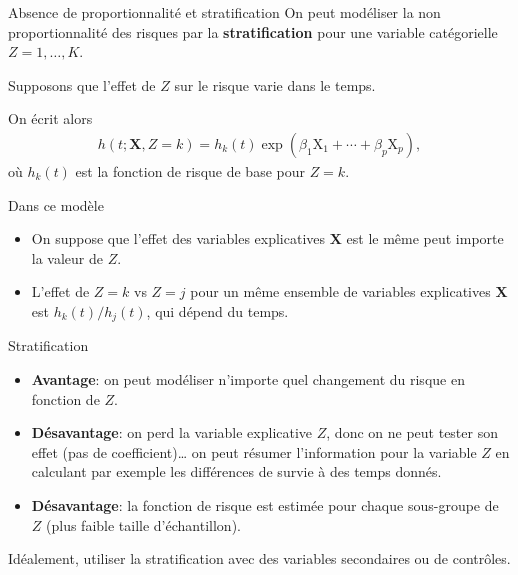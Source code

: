 \documentclass[
  ignorenonframetext,
]{beamer}
\providecommand{\tightlist}{%
  \setlength{\itemsep}{0pt}\setlength{\parskip}{0pt}}\usepackage{longtable,booktabs,array}
\begin{document}
\begin{frame}{Absence de proportionnalité et stratification}
\protect\hypertarget{absence-de-proportionnalituxe9-et-stratification}{}
On peut modéliser la non proportionnalité des risques par la
\textbf{stratification} pour une variable catégorielle
\(Z=1, \ldots, K\).

Supposons que l'effet de \(Z\) sur le risque varie dans le temps.

On écrit alors \begin{align*}
h(t; \mathbf{X}, Z=k) = h_k(t)\exp(\beta_1\mathrm{X}_1 + \cdots + \beta_p \mathrm{X}_p),
\end{align*} où \(h_k(t)\) est la fonction de risque de base pour
\(Z=k\).

Dans ce modèle

\begin{itemize}
\tightlist
\item
  On suppose que l'effet des variables explicatives \(\mathbf{X}\) est
  le même peut importe la valeur de \(Z\).
\item
  L'effet de \(Z=k\) vs \(Z=j\) pour un même ensemble de variables
  explicatives \(\mathbf{X}\) est \(h_k(t)/h_j(t)\), qui dépend du
  temps.
\end{itemize}
\end{frame}

\begin{frame}{Stratification}
\protect\hypertarget{stratification}{}
\begin{itemize}
\tightlist
\item
  \textbf{Avantage}: on peut modéliser n'importe quel changement du
  risque en fonction de \(Z\).
\item
  \textbf{Désavantage}: on perd la variable explicative \(Z\), donc on
  ne peut tester son effet (pas de coefficient)\ldots{} on peut résumer
  l'information pour la variable \(Z\) en calculant par exemple les
  différences de survie à des temps donnés.
\item
  \textbf{Désavantage}: la fonction de risque est estimée pour chaque
  sous-groupe de \(Z\) (plus faible taille d'échantillon).
\end{itemize}

Idéalement, utiliser la stratification avec des variables secondaires ou
de contrôles.
\end{frame}
\end{document}
